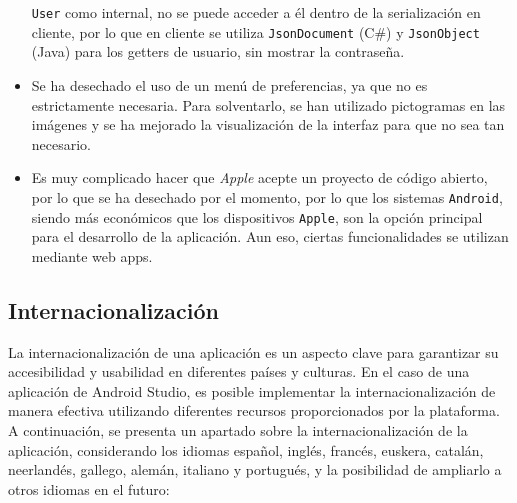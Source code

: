 \begin{itemize}
    \texttt{User} como internal, no se puede acceder a él dentro de la
    serialización en cliente, por lo que en cliente se utiliza
    \texttt{JsonDocument} (C\#) y \texttt{JsonObject} (Java) para los getters de
    usuario, sin mostrar la contraseña.
    \item Se ha desechado el uso de un menú de preferencias, ya que no es
    estrictamente necesaria. Para solventarlo, se han utilizado pictogramas en
    las imágenes y se ha mejorado la visualización de la interfaz para que no
    sea tan necesario.
    \item Es muy complicado hacer que \textit{Apple} acepte un proyecto de
    código abierto, por lo que se ha desechado por el momento, por lo que los
    sistemas \texttt{Android}, siendo más económicos que los dispositivos
    \texttt{Apple}, son la opción principal para el desarrollo de la aplicación.
    Aun eso, ciertas funcionalidades se utilizan mediante web apps.
    
\end{itemize}

\subsection{Internacionalización}

La internacionalización de una aplicación es un aspecto clave para garantizar su
accesibilidad y usabilidad en diferentes países y culturas. En el caso de una
aplicación de Android Studio, es posible implementar la internacionalización de
manera efectiva utilizando diferentes recursos proporcionados por la plataforma.
A continuación, se presenta un apartado sobre la internacionalización de la
aplicación, considerando los idiomas español, inglés, francés, euskera, catalán,
neerlandés, gallego, alemán, italiano y portugués, y la posibilidad de ampliarlo
a otros idiomas en el futuro:

